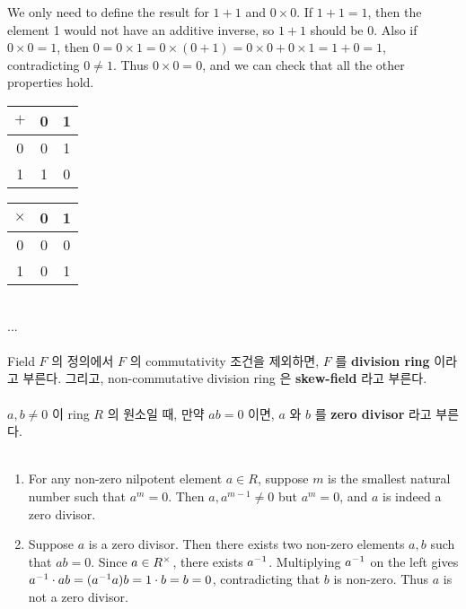 We only need to define the result for $1+1$ and $0 \times 0$. If $1+1=1$, then the element 1 would not have an additive inverse, so $1+1$ should be 0. Also if $0\times 0 = 1$, then $0 = 0 \times 1 = 0\times(0+1) = 0\times 0 + 0\times 1 = 1 + 0 = 1$, contradicting $0\neq 1$. Thus $0\times 0 = 0$, and we can check that all the other properties hold.
\begin{center}
	\begin{tabular}{c|cc}
		$+$ & 0 & 1 \\ \hline
		0 & 0 & 1\\
		1 & 1 & 0\\
	\end{tabular} \qquad
	\begin{tabular}{c|cc}
		$\times$ & 0 & 1 \\ \hline
		0 & 0 & 0\\
		1 & 0 & 1\\
	\end{tabular}
\end{center}~
\\
 ...\\
\\
 Field $F$ 의 정의에서 $F$ 의 commutativity 조건을 제외하면, $F$ 를 \textbf{division ring} 이라고 부른다. 그리고, non-commutative division ring 은 \textbf{skew-field} 라고 부른다.\\
\\
 $a, b\neq 0$ 이 ring $R$ 의 원소일 때, 만약 $ab=0$ 이면, $a$ 와 $b$ 를 \textbf{zero divisor} 라고 부른다.\\
\\
\begin{enumerate}
	\item For any non-zero nilpotent element $a \in R$, suppose $m$ is the smallest natural number such that $a^m = 0$. Then $a, a^{m-1}\neq 0$ but $a^m = 0$, and $a$ is indeed a zero divisor.
	\item Suppose $a$ is a zero divisor. Then there exists two non-zero elements $a, b$ such that $ab = 0$. Since $a\in R^\times$, there exists $a^{-1}$. Multiplying $a^{-1}$ on the left gives $a^{-1}\cdot ab = (a^{-1} a)b = 1\cdot b = b = 0$, contradicting that $b$ is non-zero. Thus $a$ is not a zero divisor.
\end{enumerate}~
\\
